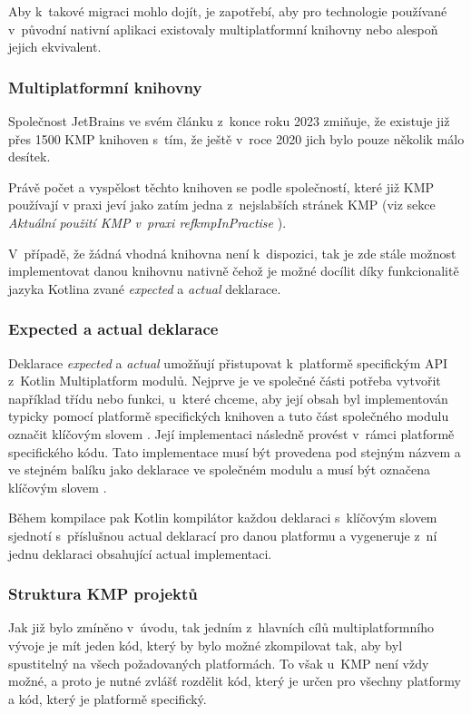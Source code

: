 Aby k~takové migraci mohlo dojít, je zapotřebí, aby pro technologie používané v~původní nativní aplikaci existovaly multiplatformní
knihovny nebo alespoň jejich ekvivalent.

\subsubsection*{Multiplatformní knihovny}
Společnost JetBrains ve svém článku z~konce roku 2023 zmiňuje, že existuje již přes 1500 KMP knihoven s~tím, že ještě v~roce 2020
jich bylo pouze několik málo desítek. \cite{KMPstable}

Právě počet a vyspělost těchto knihoven se podle společností, které již KMP používají v praxi jeví jako zatím jedna z~nejslabších stránek KMP 
(viz sekce \textit{Aktuální použití KMP v~praxi ref{kmpInPractise}
}).

V~případě, že žádná vhodná knihovna není k~dispozici, tak je zde stále možnost implementovat danou knihovnu nativně čehož je možné docílit díky funkcionalitě jazyka Kotlina
zvané \textit{expected} a \textit{actual} deklarace.

\subsubsection*{Expected a actual deklarace}\label{expectActual}
Deklarace \textit{expected} a \textit{actual} umožňují přistupovat k~platformě specifickým API z~Kotlin Multiplatform modulů. \cite{KMPExpectActual}
Nejprve je ve společné části potřeba vytvořit například třídu nebo funkci, u~které chceme, aby její obsah byl implementován typicky pomocí
platformě specifických knihoven a tuto část společného modulu označit klíčovým slovem . \cite{KMPExpectActual} Její implementaci následně provést v~rámci
platformě specifického kódu. Tato implementace musí být provedena pod stejným názvem a ve stejném balíku jako deklarace ve společném modulu
a musí být označena klíčovým slovem . \cite{KMPExpectActual}

Během kompilace pak Kotlin kompilátor každou deklaraci s~klíčovým slovem  sjednotí s~příslušnou actual deklarací pro danou platformu
a vygeneruje z~ní jednu deklaraci obsahující actual implementaci. \cite{KMPExpectActual}

\subsubsection*{Struktura KMP projektů}\label{projectStructure}
Jak již bylo zmíněno v~úvodu, tak jedním z~hlavních cílů multiplatformního vývoje je mít 
jeden kód, který by bylo možné zkompilovat tak, aby byl spustitelný na všech požadovaných platformách. To však u~KMP není vždy 
možné, a proto je nutné zvlášť rozdělit kód, který je určen pro všechny platformy a kód, který je platformě specifický. 

